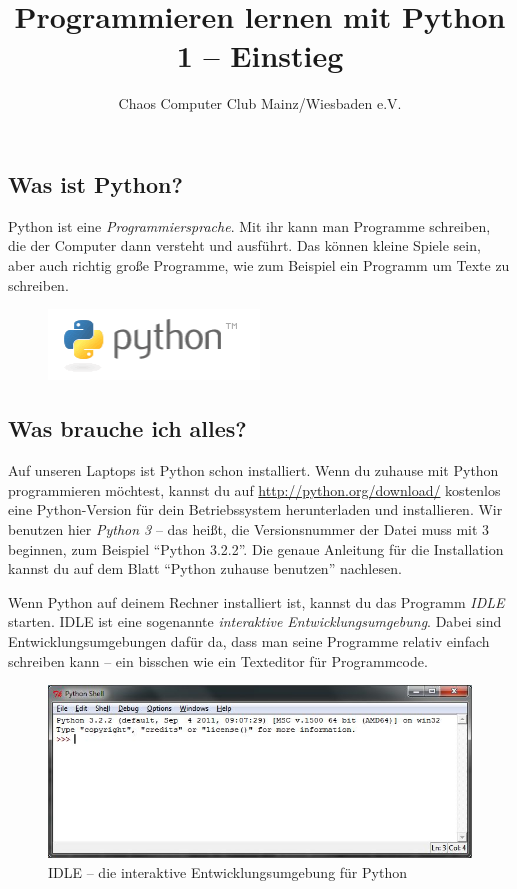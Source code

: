 



	\title{Programmieren lernen mit Python\\1 – Einstieg}
	\author{Chaos Computer Club Mainz/Wiesbaden e.V.}
	\maketitle
	
	\subsection*{Was ist Python?}
	Python ist eine \emph{Programmiersprache}. Mit ihr kann man Programme schreiben, die der Computer dann versteht und ausführt. Das können kleine Spiele sein, aber auch richtig große Programme, wie zum Beispiel ein Programm um Texte zu schreiben.
	
	\begin{figure}[htbp]
		\centering
		\includegraphics[width=0.5\textwidth]{img/python-logo.png}
	\end{figure}
	
	\subsection*{Was brauche ich alles?}
	Auf unseren Laptops ist Python schon installiert. Wenn du zuhause mit Python programmieren möchtest, kannst du auf \url{http://python.org/download/} kostenlos eine Python-Version für dein Betriebssystem herunterladen und installieren. Wir benutzen hier \emph{Python 3} – das heißt, die Versionsnummer der Datei muss mit 3 beginnen, zum Beispiel \enquote{Python 3.2.2}. Die  genaue Anleitung für die Installation kannst du auf dem Blatt \enquote{Python zuhause benutzen} nachlesen.
	
	Wenn Python auf deinem Rechner installiert ist, kannst du das Programm \emph{IDLE} starten. IDLE ist eine sogenannte \emph{interaktive Entwicklungsumgebung}. Dabei sind Entwicklungsumgebungen dafür da, dass man seine Programme relativ einfach schreiben kann – ein bisschen wie ein Texteditor für Programmcode.
	
	\begin{figure}[htbp]
		\centering
		\includegraphics[width=1\textwidth]{img/idle.jpg}
		\caption{IDLE – die interaktive Entwicklungsumgebung für Python}
		\label{IDLE}
	\end{figure}
	
